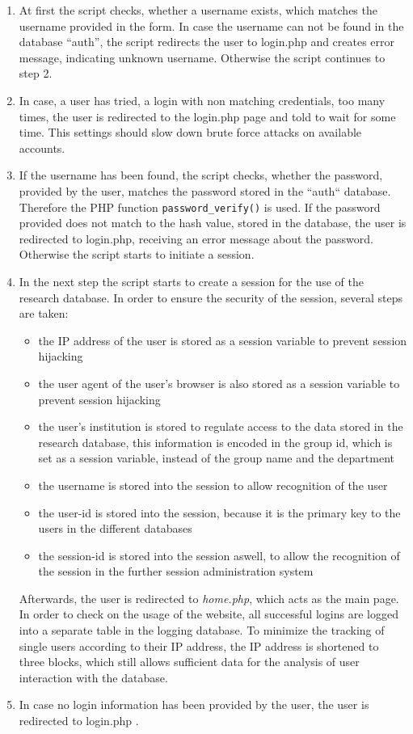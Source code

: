 \begin{enumerate}
 \item At first the script checks, whether a username exists, which matches the username provided in the form. In case the username can not be found in the database ``auth'', the script
 redirects the user to login.php and creates error message, indicating unknown username. Otherwise the script continues to step 2.
 \item In case, a user has tried, a login with non matching credentials, too many times, the user is redirected to the login.php page and told to wait for some time. This settings 
 should slow down brute force attacks on available accounts.
 \item If the username has been found, the script checks, whether the password, provided by the user, matches the password stored in the ``auth`` database. Therefore the PHP function 
 \texttt{password\_verify()} is used. If the password provided does not match to the hash value, stored in the database, the user is redirected to login.php, receiving an error message about the 
 password. Otherwise the script starts to initiate a session.
 \item In the next step the script starts to create a session for the use of the research database. In order to ensure the security of the session, several steps are taken:
 \begin{itemize}
  \item the IP address of the user is stored as a session variable to prevent session hijacking
  \item the user agent of the user's browser is also stored as a session variable to prevent session hijacking
  \item the user's institution is stored to regulate access to the data stored in the research database, this information is encoded in the group id, which is set as a session
  variable, instead of the group name and the department
  \item the username is stored into the session to allow recognition of the user 
  \item the user-id is stored into the session, because it is the primary key to the users in the different databases
  \item the session-id is stored into the session aswell, to allow the recognition of the session in the further session administration system
 \end{itemize}
  Afterwards, the user is redirected to \emph{home.php}, which acts as the main page. In order to check on the usage of the website, all successful logins are logged into a separate 
  table in the logging database. To minimize the tracking of single users according to their IP address, the IP address is shortened to three blocks, which still allows sufficient 
  data for the analysis of user interaction with the database.
  \item In case no login information has been provided by the user, the user is redirected to login.php .\\
\end{enumerate}
